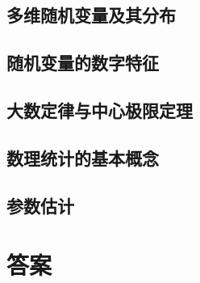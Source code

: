 \documentclass[lang=cn,newtx,11pt,scheme=chinese]{elegantbook}
\begin{document}
\section{多维随机变量及其分布}

\section{随机变量的数字特征}

\section{大数定律与中心极限定理}

\section{数理统计的基本概念}

\section{参数估计}

\nocite{*}

\printbibliography[heading=bibintoc, title=\ebibname]
\appendix
\chapter{答案}
\end{document}
